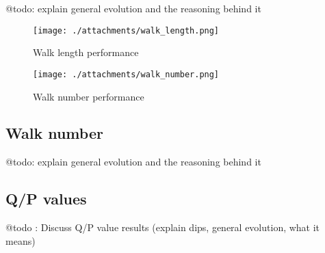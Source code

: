 \documentclass[a4paper,10pt]{article}
\begin{document}
@todo: explain general evolution and the reasoning behind it

\begin{figure}[!tbp]
  \centering
  \begin{minipage}[b]{0.49\textwidth}
    \texttt{[image: ./attachments/walk\_length.png]}
      \caption{Walk length performance}
      \label{fig:walk-length}
  \end{minipage}
  \hfill
  \begin{minipage}[b]{0.49\textwidth}
    \texttt{[image: ./attachments/walk\_number.png]}
      \caption{Walk number performance}
      \label{fig:walk-number}
  \end{minipage}
\end{figure}

\subsection{Walk number}

@todo: explain general evolution and the reasoning behind it

\subsection{Q/P values}

@todo : Discuss Q/P value results (explain dips, general evolution, what it means)
\end{document}
